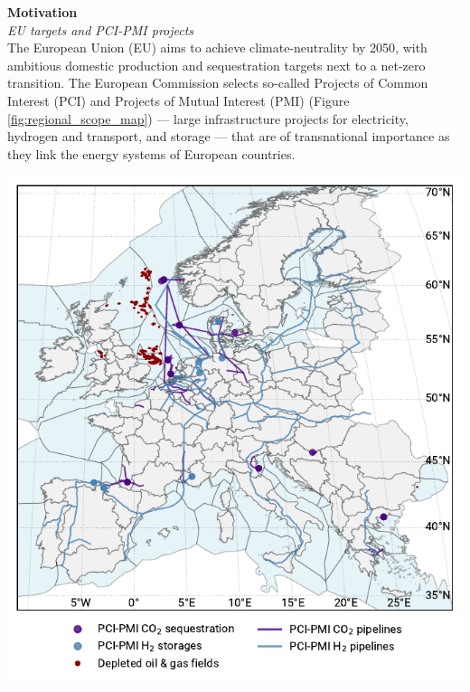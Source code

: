 \documentclass[a0,portrait]{a0poster}
\begin{document}
\vspace{14em}




\begin{multicols}{3}
\raggedcolumns


\noindent \textcolor{red100}{\huge \textbf{Motivation}}
\\
\textit{EU targets and PCI-PMI projects}
\\
\noindent
The European Union (EU) aims to achieve climate-neutrality by 2050, with ambitious domestic  production and  sequestration targets next to a net-zero transition. The European Commission selects so-called Projects of Common Interest (PCI) and Projects of Mutual Interest (PMI) (Figure \ref{fig:regional_scope_map}) --- large infrastructure projects for electricity, hydrogen and  transport, and storage --- that are of transnational importance as they link the energy systems of European countries.

\noindent
\begin{center}
    \includegraphics[width=0.90\linewidth]{map_adm_pcipmi.pdf}
    \label{fig:regional_scope_map}
\end{center}


\end{multicols}
\end{document}
